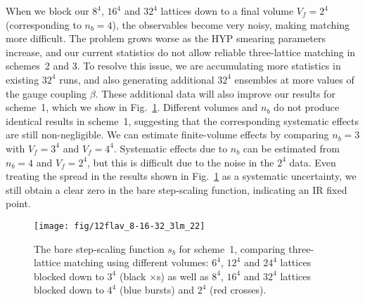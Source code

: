 \documentclass{PoS}
\newcommand{\be}{\ensuremath{\beta} }
\newcommand{\fig}[1]{Fig.~\ref{#1}}
\begin{document}
When we block our $8^4$, $16^4$ and $32^4$ lattices down to a final volume $V_f = 2^4$ (corresponding to $n_b = 4$), the observables become very noisy, making matching more difficult.
The problem grows worse as the HYP smearing parameters increase, and our current statistics do not allow reliable three-lattice matching in schemes~2 and 3.
To resolve this issue, we are accumulating more statistics in existing $32^4$ runs, and also generating additional $32^4$ ensembles at more values of the gauge coupling $\be$.
These additional data will also improve our results for scheme~1, which we show in \fig{fig:scheme1}.
Different volumes and $n_b$ do not produce identical results in scheme~1, suggesting that the corresponding systematic effects are still non-negligible.
We can estimate finite-volume effects by comparing $n_b = 3$ with $V_f = 3^4$ and $V_f = 4^4$.
Systematic effects due to $n_b$ can be estimated from $n_b = 4$ and $V_f = 2^4$, but this is difficult due to the noise in the $2^4$ data.
Even treating the spread in the results shown in \fig{fig:scheme1} as a systematic uncertainty, we still obtain a clear zero in the bare step-scaling function, indicating an IR fixed point.

\begin{figure}[th]
  \centering
  \texttt{[image: fig/12flav\_8-16-32\_3lm\_22]}
  \caption{The bare step-scaling function $s_b$ for scheme~1, comparing three-lattice matching using different volumes: $6^4$, $12^4$ and $24^4$ lattices blocked down to $3^4$ (black $\times$s) as well as $8^4$, $16^4$ and $32^4$ lattices blocked down to $4^4$ (blue bursts) and $2^4$ (red crosses).}
  \label{fig:scheme1}
\end{figure}



\end{document}
